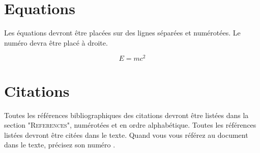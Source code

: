\documentclass{article}
\begin{document}

\section{Equations}

Les équations devront être placées sur des lignes séparées et numérotées. Le numéro devra être placé à droite.

\begin{equation}
E=mc^{2}
\end{equation}

\section{Citations}

Toutes les références bibliographiques des citations devront être listées dans la section "\textsc{References}", numérotées et en ordre alphabétique. Toutes les références  listées devront être citées dans le texte. Quand  vous vous référez au document dans le texte, précisez son numéro \cite{Author:00}.


\end{document}
